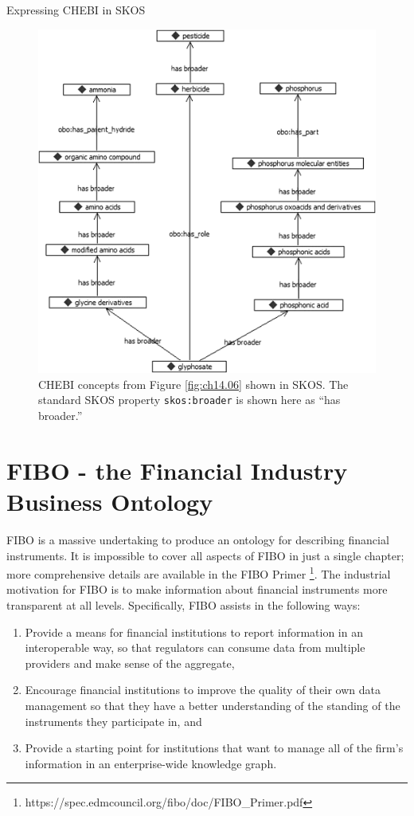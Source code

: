 \begin{challenge}{Expressing CHEBI in SKOS}
\begin{figure}
\centering
\includegraphics[width=5in]{media/ch14/f14-07.png}
\caption{CHEBI concepts from Figure \protect\ref{fig:ch14.06} shown in SKOS. The standard SKOS
property \texttt{skos:broader} is shown here as ``has broader.''
}
\label{fig:ch14.07}
\end{figure}
\end{challenge}

\section{FIBO - the Financial Industry Business Ontology}
\label{section:fibo}

FIBO is a massive undertaking to produce an ontology for describing financial instruments.  It is impossible to cover all aspects of FIBO 
in just a single chapter; more comprehensive details are available in the FIBO Primer
\footnote{https://spec.edmcouncil.org/fibo/doc/FIBO\_Primer.pdf}.   The industrial
motivation for FIBO is to make information about financial instruments more transparent at all levels. 
Specifically, 
FIBO assists in the following ways:

\begin{enumerate}
    \item Provide a means for financial institutions to report information in an interoperable way, so that regulators can 
    consume data from multiple providers and make sense of the aggregate, 
    \item Encourage financial institutions to improve the quality of their own data management so that they have 
    a better understanding of the standing of the instruments they participate in, and 
    \item Provide a starting point for institutions that want to manage all of the firm's information in an enterprise-wide knowledge graph. 
\end{enumerate}

